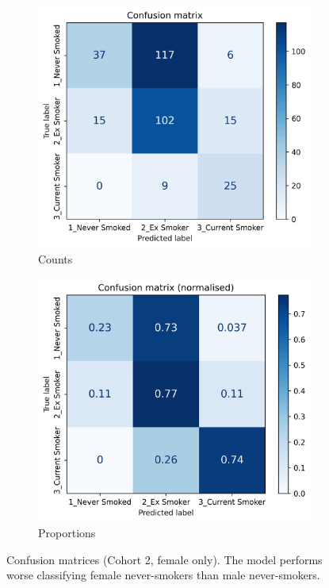 \documentclass{article} %
\begin{document}
\begin{figure}[!p]
    \centering
    \begin{subfigure}{0.42\linewidth}
        \centering
        \includegraphics[width=\linewidth]{cohort2/female_only/test_confusion_matrix.png}
        \caption{Counts}
    \end{subfigure}
    \hspace{4mm}
    \begin{subfigure}{0.42\linewidth}
        \centering
        \includegraphics[width=\linewidth]{cohort2/female_only/test_confusion_matrix_normalised.png}
        \caption{Proportions}
    \end{subfigure}
    \caption[Confusion matrices (Cohort 2, female only)]{Confusion matrices (Cohort 2, female only). The model performs worse classifying female never-smokers than male never-smokers.}
    \label{fig:female-only-confusion-matrix}
\end{figure}
\end{document}

